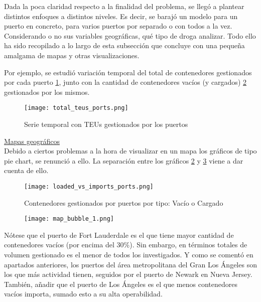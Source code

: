 \documentclass[12pt]{article}
\begin{document}
		
		Dada la poca claridad respecto a la finalidad del problema, se llegó a plantear distintos enfoques a distintos niveles. Es decir, se barajó un modelo para un puerto en concreto, para varios puertos por separado o con todos a la vez. Considerando o no sus variables geográficas, qué tipo de droga analizar. Todo ello ha sido recopilado a lo largo de esta subsección que concluye con una pequeña amalgama de mapas y otras visualizaciones.
		
		Por ejemplo, se estudió variación temporal del total de contenedores gestionados por cada puerto \ref{total_teus_ports}, junto con la cantidad de contenedores vacíos (y cargados) \ref{loaded_vs_imports_ports} gestionados por los mismos.
		
		\begin{figure}[H]
			\caption{\label{total_teus_ports} Serie temporal con TEUs gestionados por los puertos}
			\centering
			\hspace*{1cm}
			\texttt{[image: total\_teus\_ports.png]}
		\end{figure}
		
		
		\underline{Mapas geográficos}\\
		Debido a ciertos problemas a la hora de visualizar en un mapa los gráficos de tipo pie chart, se renunció a ello. La separación entre los gráficos \ref{loaded_vs_imports_ports} y \ref{map_bubble_1} viene a dar cuenta de ello.
		
		\begin{figure}[H]
			\caption{\label{loaded_vs_imports_ports} Contenedores gestionados por puertos por tipo: Vacío o Cargado}
			\centering
			\hspace*{1cm}
			\texttt{[image: loaded\_vs\_imports\_ports.png]}
		\end{figure}
	
		
		\begin{figure}[H]
			\caption{\label{map_bubble_1} }
			\centering
			\hspace*{1cm}
			\texttt{[image: map\_bubble\_1.png]}
		\end{figure}
	
		Nótese que el puerto de Fort Lauderdale es el que tiene mayor cantidad de contenedores vacíos (por encima del 30\%). Sin embargo, en términos totales de volumen gestionado es el menor de todos los investigados. Y como se comentó en apartados anteriores, los puertos del área metropolitana del Gran Los Ángeles son los que más actividad tienen, seguidos por el puerto de Newark en Nueva Jersey. También, añadir que el puerto de Los Ángeles es el que menos contenedores vacíos importa, sumado esto a su alta operabilidad.
\end{document}
